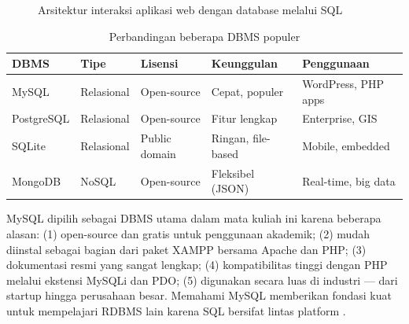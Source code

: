 \begin{figure}[H]
\centering
{}
\caption{Arsitektur interaksi aplikasi web dengan database melalui SQL}
\end{figure}

\begin{table}[H]
\centering
\begin{tabular}{|P{2.5cm}|P{2cm}|P{2.5cm}|P{2.5cm}|P{2.5cm}|}
\hline
\textbf{DBMS} & \textbf{Tipe} & \textbf{Lisensi} & \textbf{Keunggulan} & \textbf{Penggunaan} \\
\hline
MySQL & Relasional & Open-source & Cepat, populer & WordPress, PHP apps \\
\hline
PostgreSQL & Relasional & Open-source & Fitur lengkap & Enterprise, GIS \\
\hline
SQLite & Relasional & Public domain & Ringan, file-based & Mobile, embedded \\
\hline
MongoDB & NoSQL & Open-source & Fleksibel (JSON) & Real-time, big data \\
\hline
\end{tabular}
\caption{Perbandingan beberapa DBMS populer}
\end{table}

MySQL dipilih sebagai DBMS utama dalam mata kuliah ini karena beberapa alasan: (1) open-source dan gratis untuk penggunaan akademik; (2) mudah diinstal sebagai bagian dari paket XAMPP bersama Apache dan PHP; (3) dokumentasi resmi yang sangat lengkap; (4) kompatibilitas tinggi dengan PHP melalui ekstensi MySQLi dan PDO; (5) digunakan secara luas di industri --- dari startup hingga perusahaan besar. Memahami MySQL memberikan fondasi kuat untuk mempelajari RDBMS lain karena SQL bersifat lintas platform \cite{mysqlDocs}.

